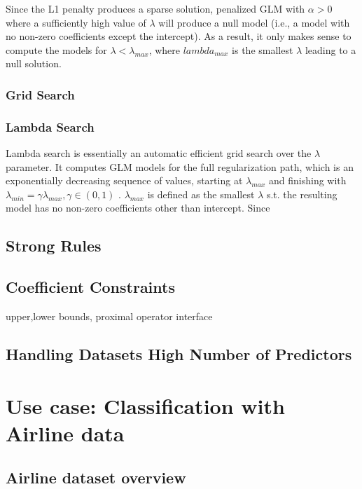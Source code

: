 \documentclass[11pt]{article}
\begin{document}
Since the L1 penalty produces a sparse solution, penalized GLM with  $\alpha > 0$ where a sufficiently high value of $\lambda$ will produce a null model (i.e., a model with no non-zero coefficients except the intercept). As a result, it only makes sense to compute the models for $\lambda < \lambda_{max}$, where $lambda_{max}$ is the smallest $\lambda$ leading to a null solution.

\subsubsection{Grid Search}
\subsubsection{Lambda Search}
Lambda search is essentially an automatic efficient grid search over the $\lambda$ parameter. It computes GLM models for the full regularization path, which is an exponentially decreasing sequence of values, starting at $\lambda_{max}$ and finishing with $\lambda_{min} = \gamma\lambda_{max}, \gamma \in (0,1)$ . $\lambda_{max}$ is defined as the smallest $\lambda$ s.t. the resulting model has no non-zero coefficients other than intercept. Since 



\subsection{Strong Rules}

\subsection{Coefficient Constraints}
upper,lower bounds, proximal operator interface

\subsection{Handling Datasets High Number of Predictors}


\section{Use case: Classification with Airline data}


\subsection{Airline dataset overview} 
\end{document}
